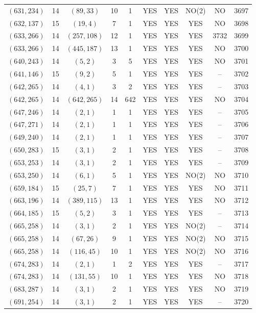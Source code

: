 \begin{longtable}{|c|c|c|c|c|c|c|c|c|c|}
$(631, 234)$ & 14 & $(89, 33)$ & 10 & 1 & YES & YES & NO(2) & NO & 3697\\
$(632, 137)$ & 15 & $(19, 4)$ & 7 & 1 & YES & YES & YES & NO & 3698\\
$(633, 266)$ & 14 & $(257, 108)$ & 12 & 1 & YES & YES & YES & 3732 & 3699\\
$(633, 266)$ & 14 & $(445, 187)$ & 13 & 1 & YES & YES & YES & NO & 3700\\
$(640, 243)$ & 14 & $(5, 2)$ & 3 & 5 & YES & YES & YES & NO & 3701\\
$(641, 146)$ & 15 & $(9, 2)$ & 5 & 1 & YES & YES & YES & -- & 3702\\
$(642, 265)$ & 14 & $(4, 1)$ & 3 & 2 & YES & YES & YES & -- & 3703\\
$(642, 265)$ & 14 & $(642, 265)$ & 14 & 642 & YES & YES & YES & NO & 3704\\
$(647, 246)$ & 14 & $(2, 1)$ & 1 & 1 & YES & YES & YES & -- & 3705\\
$(647, 271)$ & 14 & $(2, 1)$ & 1 & 1 & YES & YES & YES & -- & 3706\\
$(649, 240)$ & 14 & $(2, 1)$ & 1 & 1 & YES & YES & YES & -- & 3707\\
$(650, 283)$ & 15 & $(3, 1)$ & 2 & 1 & YES & YES & YES & -- & 3708\\
$(653, 253)$ & 14 & $(3, 1)$ & 2 & 1 & YES & YES & YES & -- & 3709\\
$(653, 250)$ & 14 & $(6, 1)$ & 5 & 1 & YES & YES & NO(2) & NO & 3710\\
$(659, 184)$ & 15 & $(25, 7)$ & 7 & 1 & YES & YES & YES & NO & 3711\\
$(663, 196)$ & 14 & $(389, 115)$ & 13 & 1 & YES & YES & YES & NO & 3712\\
$(664, 185)$ & 15 & $(5, 2)$ & 3 & 1 & YES & YES & YES & -- & 3713\\
$(665, 258)$ & 14 & $(3, 1)$ & 2 & 1 & YES & YES & NO(2) & -- & 3714\\
$(665, 258)$ & 14 & $(67, 26)$ & 9 & 1 & YES & YES & NO(2) & NO & 3715\\
$(665, 258)$ & 14 & $(116, 45)$ & 10 & 1 & YES & YES & NO(2) & NO & 3716\\
$(674, 283)$ & 14 & $(2, 1)$ & 1 & 2 & YES & YES & YES & -- & 3717\\
$(674, 283)$ & 14 & $(131, 55)$ & 10 & 1 & YES & YES & YES & NO & 3718\\
$(683, 287)$ & 14 & $(3, 1)$ & 2 & 1 & YES & YES & YES & NO & 3719\\
$(691, 254)$ & 14 & $(3, 1)$ & 2 & 1 & YES & YES & YES & -- & 3720\\

\end{longtable}
